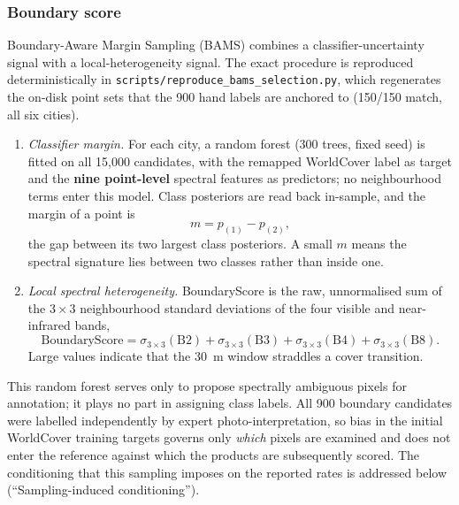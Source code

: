 \subsubsection*{Boundary score}

Boundary-Aware Margin Sampling (BAMS) combines a classifier-uncertainty signal
with a local-heterogeneity signal. The exact procedure is reproduced
deterministically in \texttt{scripts/reproduce\_bams\_selection.py}, which
regenerates the on-disk point sets that the 900 hand labels are anchored to
(150/150 match, all six cities).

\begin{enumerate}[leftmargin=*,labelsep=4.5mm]
\item \emph{Classifier margin.} For each city, a random forest (300 trees, fixed
  seed) is fitted on all 15,000 candidates, with the remapped WorldCover label
  as target and the \textbf{nine point-level} spectral features as predictors;
  no neighbourhood terms enter this model. Class posteriors are read back
  in-sample, and the margin of a point is
  \begin{equation}\label{eq:margin}
  m = p_{(1)} - p_{(2)},
  \end{equation}
  the gap between its two largest class posteriors. A small $m$ means the
  spectral signature lies between two classes rather than inside one.
\item \emph{Local spectral heterogeneity.} BoundaryScore is the raw,
  unnormalised sum of the $3 \times 3$ neighbourhood standard deviations of the
  four visible and near-infrared bands,
  \begin{equation}\label{eq:bscore}
  \mathrm{BoundaryScore} = \sigma_{3\times3}(\mathrm{B2}) + \sigma_{3\times3}(\mathrm{B3})
  + \sigma_{3\times3}(\mathrm{B4}) + \sigma_{3\times3}(\mathrm{B8}).
  \end{equation}
  Large values indicate that the 30~m window straddles a cover transition.
\end{enumerate}

This random forest serves only to propose spectrally ambiguous pixels for
annotation; it plays no part in assigning class labels. All 900 boundary
candidates were labelled independently by expert photo-interpretation, so bias
in the initial WorldCover training targets governs only \emph{which} pixels are
examined and does not enter the reference against which the products are
subsequently scored. The conditioning that this sampling imposes on the reported
rates is addressed below (``Sampling-induced conditioning'').


